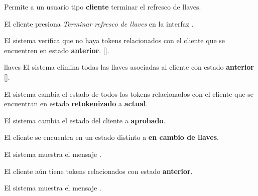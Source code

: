 %
%

{
  Permite a un usuario tipo \textbf{cliente} terminar el refresco de llaves.

  \begin{trayectoriaPrincipal}

    \item El cliente presiona \textit{Terminar refresco de llaves} en la
      interfaz .

    \item El sistema verifica que no haya tokens relacionados con el cliente
      que se encuentren en estado \textbf{anterior}.
      [].

    \item[llaves] El sistema elimina todas las llaves asociadas al cliente con
      estado \textbf{anterior} [].

    \item El sistema cambia el estado de todos los tokens relacionados con el
      cliente que se encuentran en estado \textbf{retokenizado} a
      \textbf{actual}.

    \item El sistema cambia el estado del cliente a \textbf{aprobado}.

  \end{trayectoriaPrincipal}

  \begin{trayectoriaAlternativa}
    {El cliente se encuentra en un estado distinto a
      \textbf{en cambio de llaves}.}

    \item El sistema muestra el mensaje
      .

  \end{trayectoriaAlternativa}

  \begin{trayectoriaAlternativa}
    {El cliente aún tiene tokens relacionados con estado \textbf{anterior}.}

    \item El sistema muestra el mensaje
      .


\end{trayectoriaAlternativa}}
